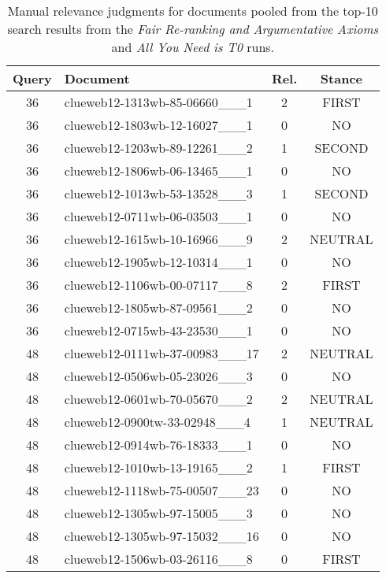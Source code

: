 \begin{table}
    \centering
    \caption{Manual relevance judgments for documents pooled from the top-10 search results from the \emph{Fair Re-ranking and Argumentative Axioms} and \emph{All You Need is T0} runs.}
    \label{table-judgments}
    \begin{tabular}{clcc}
        \toprule
        \textbf{Query} & \textbf{Document} & \textbf{Rel.} & \textbf{Stance} \\
        \midrule
        36 & clueweb12-1313wb-85-06660\_\_\_1 & 2 & FIRST \\
        36 & clueweb12-1803wb-12-16027\_\_\_1 & 0 & NO \\
        36 & clueweb12-1203wb-89-12261\_\_\_2 & 1 & SECOND \\
        36 & clueweb12-1806wb-06-13465\_\_\_1 & 0 & NO \\
        36 & clueweb12-1013wb-53-13528\_\_\_3 & 1 & SECOND \\
        36 & clueweb12-0711wb-06-03503\_\_\_1 & 0 & NO \\
        36 & clueweb12-1615wb-10-16966\_\_\_9 & 2 & NEUTRAL \\
        36 & clueweb12-1905wb-12-10314\_\_\_1 & 0 & NO \\
        36 & clueweb12-1106wb-00-07117\_\_\_8 & 2 & FIRST \\
        36 & clueweb12-1805wb-87-09561\_\_\_2 & 0 & NO \\
        36 & clueweb12-0715wb-43-23530\_\_\_1 & 0 & NO \\
        \midrule
        48 & clueweb12-0111wb-37-00983\_\_\_17 & 2 & NEUTRAL \\
        48 & clueweb12-0506wb-05-23026\_\_\_3 & 0 & NO \\
        48 & clueweb12-0601wb-70-05670\_\_\_2 & 2 & NEUTRAL \\
        48 & clueweb12-0900tw-33-02948\_\_\_4 & 1 & NEUTRAL \\
        48 & clueweb12-0914wb-76-18333\_\_\_1 & 0 & NO \\
        48 & clueweb12-1010wb-13-19165\_\_\_2 & 1 & FIRST \\
        48 & clueweb12-1118wb-75-00507\_\_\_23 & 0 & NO \\
        48 & clueweb12-1305wb-97-15005\_\_\_3 & 0 & NO \\
        48 & clueweb12-1305wb-97-15032\_\_\_16 & 0 & NO \\
        48 & clueweb12-1506wb-03-26116\_\_\_8 & 0 & FIRST \\

\end{tabular}
\end{table}
